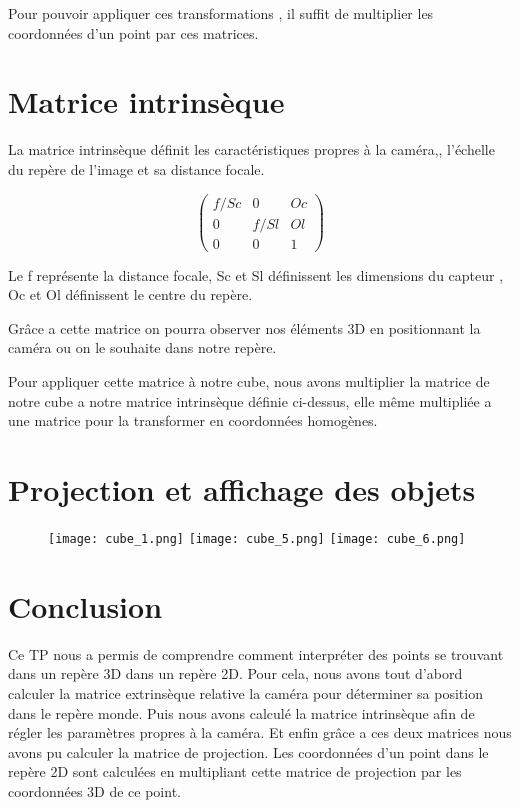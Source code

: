 \documentclass[a4paper,12pt]{report}
\begin{document}
Pour pouvoir appliquer ces transformations , il suffit de multiplier les coordonnées d’un point par ces matrices.

\newpage

\section*{Matrice intrinsèque}
La matrice intrinsèque définit les caractéristiques propres à la caméra,, l'échelle du repère de l’image et sa distance focale. 

\[
   \left (
   \begin{array}{ccc}
      f/Sc & 0 & Oc\\
0 & f/Sl &  Ol\\
0 & 0 & 1
   \end{array}
   \right )
\]

Le f représente la distance focale, Sc et Sl définissent les dimensions du capteur ,  Oc et Ol définissent le centre du repère.

Grâce a cette matrice on pourra observer nos éléments 3D en positionnant la caméra ou on le souhaite dans notre repère.

Pour appliquer cette matrice à notre cube, nous avons multiplier la matrice de notre cube a notre matrice intrinsèque définie ci-dessus, elle même multipliée a une matrice pour la transformer en coordonnées homogènes.

\section*{Projection et affichage des objets}
\begin{figure}[!ht]
\center
	\texttt{[image: cube\_1.png]}
	\texttt{[image: cube\_5.png]}
	\texttt{[image: cube\_6.png]}
\end{figure}

\section*{Conclusion}

Ce TP nous a permis de comprendre comment interpréter des points se trouvant dans un repère 3D dans un repère 2D. Pour cela, nous avons tout d’abord calculer la matrice extrinsèque relative la caméra pour déterminer sa position dans le repère monde. Puis nous avons calculé la matrice intrinsèque afin de régler les paramètres propres à la caméra. Et enfin grâce a ces deux matrices nous avons pu calculer la matrice de projection. Les coordonnées d’un point dans le repère 2D sont calculées en multipliant cette matrice de projection par les coordonnées 3D de ce point.
\end{document}

